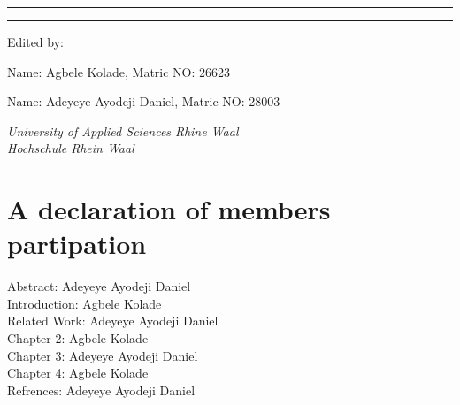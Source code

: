 \documentclass[12pt]{extreport}
\begin{document}
\vspace*{0.2in}


\begin{center}
	\rule{\textwidth}{1.6pt}\vspace*{-\baselineskip}\vspace*{2pt} %

{\Large
\textbf{}
}
\rule{\textwidth}{0.4pt} %
\newline

Edited by: 
\\
\bigskip
\vspace{0.5\baselineskip} %

\textbf{} Name: Agbele Kolade, Matric NO: 26623
\\
\vspace{0.5\baselineskip} %

\textbf{} Name: Adeyeye Ayodeji Daniel, Matric NO: 28003
\\
\vspace{0.5\baselineskip} %
\vspace{0.5\baselineskip} %

\textit{University of Applied Sciences Rhine Waal\\ Hochschule Rhein Waal } %

\vfill %

\bigskip
\end{center}

\newpage
\section*{A declaration of members partipation}

\bigskip
\vspace{0.5\baselineskip} 
Abstract: Adeyeye Ayodeji Daniel
\\
\bigskip
\vspace{0.5\baselineskip} 
Introduction: Agbele Kolade
\\
\bigskip
\vspace{0.5\baselineskip} 
Related Work: Adeyeye Ayodeji Daniel
\\
\bigskip
\vspace{0.5\baselineskip} 
Chapter 2: Agbele Kolade
\\
\bigskip
\vspace{0.5\baselineskip} 
Chapter 3: Adeyeye Ayodeji Daniel
\\
\bigskip
\vspace{0.5\baselineskip} 
Chapter 4: Agbele Kolade
\\
\bigskip
\vspace{0.5\baselineskip} 
Refrences: Adeyeye Ayodeji Daniel
\end{document}
